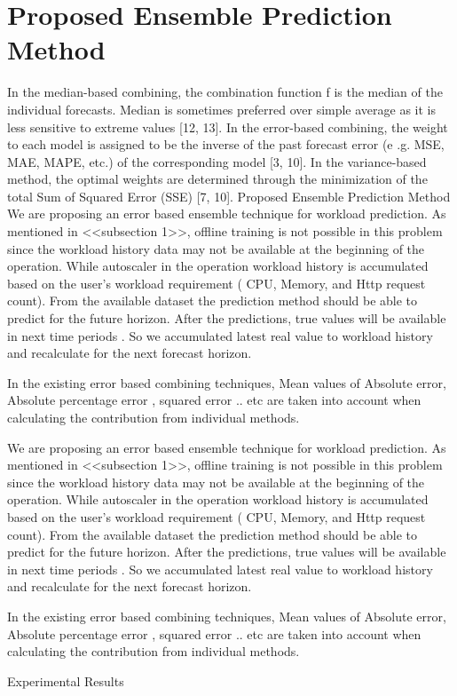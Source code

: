\section{Proposed Ensemble Prediction Method}

In the median-based combining, the combination function f is the median of the individual forecasts. Median is 
sometimes preferred over simple average as it is less sensitive to extreme values [12, 13].
In the error-based combining, the weight to each model is assigned to be the inverse of the past forecast error (e
.g. MSE, MAE, MAPE, etc.) of the corresponding model [3, 10].
In the variance-based method, the optimal weights are determined through the minimization of the total Sum of 
Squared Error (SSE) [7, 10].
Proposed Ensemble Prediction Method
We are proposing an error based ensemble technique for workload prediction. As mentioned in <<subsection 1>>, 
offline training is not possible in this problem since the  workload history data may not be available at the 
beginning of the operation. While autoscaler in the operation workload history  is accumulated based on the user's 
workload requirement ( CPU, Memory, and Http request count). From the available dataset the prediction method 
should be able to predict for the future horizon. After the predictions, true values will be available in next time 
periods . So we accumulated latest real value to workload history and recalculate for the next forecast horizon. 
        
    In the existing error based combining techniques, Mean values of Absolute error, Absolute percentage error , 
squared error .. etc are taken into account when calculating the contribution from individual methods. 


We are proposing an error based ensemble technique for workload prediction. As mentioned in <<subsection 1>>, offline training is not possible in this problem since the  workload history data may not be available at the beginning of the operation. While autoscaler in the operation workload history  is accumulated based on the user's workload requirement ( CPU, Memory, and Http request count). From the available dataset the prediction method should be able to predict for the future horizon. After the predictions, true values will be available in next time periods . So we accumulated latest real value to workload history and recalculate for the next forecast horizon. 
		
	In the existing error based combining techniques, Mean values of Absolute error, Absolute percentage error , squared error .. etc are taken into account when calculating the contribution from individual methods. 






Experimental Results
